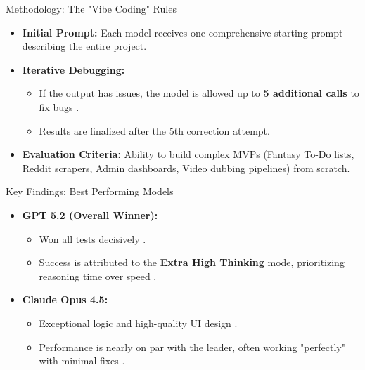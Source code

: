 \documentclass[aspectratio=169]{beamer}
\begin{document}
\begin{frame}[t]{Methodology: The "Vibe Coding" Rules}
    \begin{itemize}
        \item \textbf{Initial Prompt:} Each model receives one comprehensive starting prompt describing the entire project.
        \item \textbf{Iterative Debugging:}
        \begin{itemize}
            \item If the output has issues, the model is allowed up to \textbf{5 additional calls} to fix bugs .
            \item Results are finalized after the 5th correction attempt.
        \end{itemize}
        \item \textbf{Evaluation Criteria:} Ability to build complex MVPs (Fantasy To-Do lists, Reddit scrapers, Admin dashboards, Video dubbing pipelines) from scratch.
    \end{itemize}
\end{frame}

\begin{frame}[t]{Key Findings: Best Performing Models}
    \begin{itemize}
        \item \textbf{GPT 5.2 (Overall Winner):}
        \begin{itemize}
            \item Won all tests decisively .
            \item Success is attributed to the \textbf{Extra High Thinking} mode, prioritizing reasoning time over speed .
        \end{itemize}
        \item \textbf{Claude Opus 4.5:}
        \begin{itemize}
            \item Exceptional logic and high-quality UI design .
            \item Performance is nearly on par with the leader, often working "perfectly" with minimal fixes .
        \end{itemize}
    \end{itemize}
\end{frame}
\end{document}
